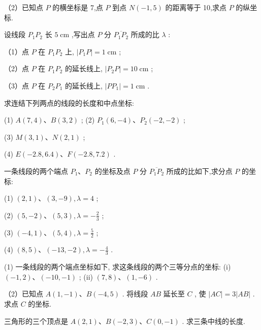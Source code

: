 \documentclass[lang=cn,newtx,10pt,scheme=chinese]{elegantbook}
\begin{document}
\begin{problemset}[习 题 一]
（2）已知点 \(P\) 的横坐标是 7,点 \(P\) 到点 \(N\left( {-1,5}\right)\) 的距离等于 10,求点 \(P\) 的纵坐标.

\item 设线段 \({P}_{1}{P}_{2}\) 长 \(5\mathrm{\;{cm}}\) ,写出点 \(P\) 分 \(\overline{{P}_{1}{P}_{2}}\) 所成的比 \(\lambda\) :

（1）点 \(P\) 在 \({P}_{1}{P}_{2}\) 上, \(\left| {{P}_{1}P}\right| = 1\mathrm{\;{cm}}\) ;

（2）点 \(P\) 在 \({P}_{1}{P}_{2}\) 的延长线上, \(\left| {{P}_{2}P}\right| = {10}\mathrm{\;{cm}}\) ;

（3）点 \(P\) 在 \({P}_{2}{P}_{1}\) 的延长线上, \(\left| {P{P}_{1}}\right| = 1\mathrm{\;{cm}}\) .

\item 求连结下列两点的线段的长度和中点坐标:

(1) \(A\left( {7,4}\right) \text{、}B\left( {3,2}\right)\) ; (2) \({P}_{1}\left( {6, - 4}\right) \text{、}{P}_{2}\left( {-2, - 2}\right)\) ;

(3) \(M\left( {3,1}\right) \text{、}N\left( {2,1}\right)\) ;

(4) \(E\left( {-{2.8},{6.4}}\right) \text{、}F\left( {-{2.8},{7.2}}\right)\) .

\item 一条线段的两个端点 \({P}_{1}\text{、}{P}_{2}\) 的坐标及点 \(P\) 分 \(\overline{{P}_{1}{P}_{2}}\) 所成的比如下,求分点 \(P\) 的坐标:

(1) \(\left( {2,1}\right) \text{、}\left( {3, - 9}\right) ,\lambda = 4\) ;

(2) \(\left( {5, - 2}\right) \text{、}\left( {5,3}\right) ,\lambda = - \frac{2}{3}\) ;

(3) \(\left( {-4,1}\right) \text{、}\left( {5,4}\right) ,\lambda = \frac{5}{2}\) ;

(4) \(\left( {8,5}\right) \text{、}\left( {-{13}, - 2}\right) ,\lambda = - \frac{4}{3}\) .

\item (1) 一条线段的两个端点坐标如下, 求这条线段的两个三等分点的坐标: (i) \(\left( {-1,2}\right) \text{、}\left( {-{10}, - 1}\right)\) ; (ii) \(\left( {7,8}\right) \text{、}\left( {1, - 6}\right)\) .

（2）已知点 \(A\left( {1, - 1}\right) \text{、}B\left( {-4,5}\right)\) . 将线段 \({AB}\) 延长至 \(C\) , 使 \(\left| {AC}\right| = 3\left| {AB}\right|\) . 求点 \(C\) 的坐标.

\item 三角形的三个顶点是 \(A\left( {2,1}\right) \text{、}B\left( {-2,3}\right) \text{、}C\left( {0, - 1}\right)\) . 求三条中线的长度.


\end{problemset}
\end{document}
